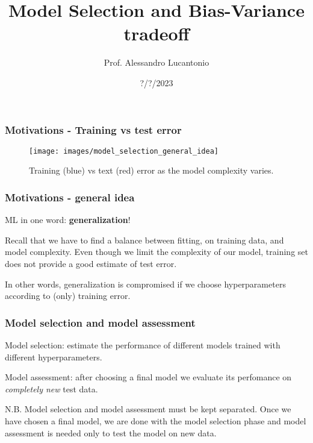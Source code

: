 \documentclass{beamer}
\title{Model Selection and Bias-Variance tradeoff}
\author{Prof. Alessandro Lucantonio}
\institute{Aarhus University - Department of Mechanical and Production Engineering}
\date{?/?/2023}
\begin{document}
	\frame{\titlepage}
	
	\begin{frame}
		\frametitle{Motivations - Training vs test error}
		\begin{figure}
			\centering
			\texttt{[image: images/model\_selection\_general\_idea]}
			\caption{Training (blue) vs text (red) error as the model complexity varies.}
		\end{figure}
	\end{frame}
	
	\begin{frame}
		\frametitle{Motivations - general idea}
		ML in one word: \textbf{generalization}!
		
		\vspace{5mm}
		
		Recall that we have to find a balance between fitting, on training data, and model complexity. Even though we limit the complexity of our model, training set does not provide a good estimate of test error.
		
		\vspace{5mm}
		
		In other words, generalization is compromised if we choose hyperparameters according to (only) training error.
	\end{frame}

	\begin{frame}
		\frametitle{Model selection and model assessment}
		Model selection: estimate the performance of different models trained with different hyperparameters. 
		
		\vspace{5mm}
		
		Model assessment: after choosing a final model we evaluate its perfomance on \textsl{completely new} test data.
		
		\vspace{5mm}
		
		N.B. Model selection and model assessment must be kept separated. Once we have chosen a final model, we are done with the model selection phase and model assessment is needed only to test the model on new data.
	\end{frame}
\end{document}
